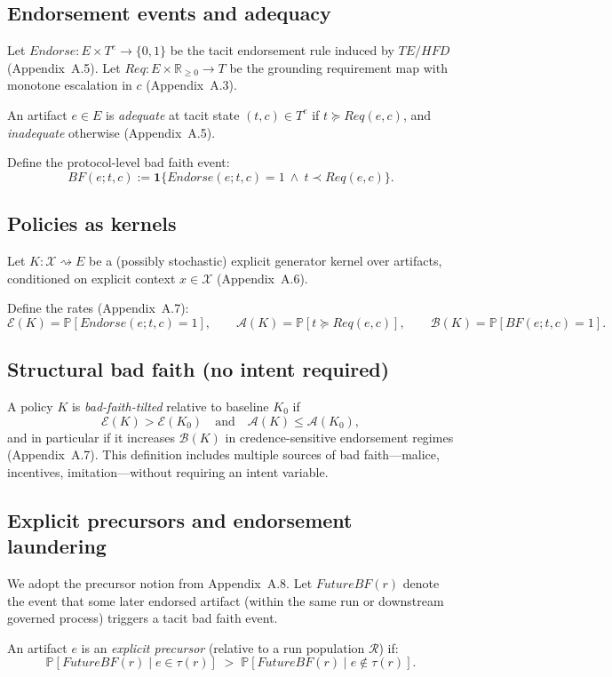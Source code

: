 \documentclass[preprints,article,submit,pdftex,moreauthors,accept]{Definitions/mdpi}
\begin{document}
\subsection{Endorsement events and adequacy}
Let \(Endorse:E\times T^e\to\{0,1\}\) be the tacit endorsement rule induced by \(TE/HFD\) (Appendix~A.5). Let \(Req:E\times\mathbb{R}_{\ge 0}\to T\) be the grounding requirement map with monotone escalation in \(c\) (Appendix~A.3).

An artifact \(e\in E\) is \emph{adequate} at tacit state \((t,c)\in T^e\) if \(t\succeq Req(e,c)\), and \emph{inadequate} otherwise (Appendix~A.5).

Define the protocol-level bad faith event:
\[
BF(e;t,c):=\mathbf{1}\{Endorse(e;t,c)=1 \ \wedge\ t\prec Req(e,c)\}.
\]

\subsection{Policies as kernels}
Let \(K:\mathcal{X}\rightsquigarrow E\) be a (possibly stochastic) explicit generator kernel over artifacts, conditioned on explicit context \(x\in\mathcal{X}\) (Appendix~A.6).

Define the rates (Appendix~A.7):
\[
\mathcal{E}(K)=\mathbb{P}[Endorse(e;t,c)=1],\qquad
\mathcal{A}(K)=\mathbb{P}[t\succeq Req(e,c)],\qquad
\mathcal{B}(K)=\mathbb{P}[BF(e;t,c)=1].
\]

\subsection{Structural bad faith (no intent required)}
A policy \(K\) is \emph{bad-faith-tilted} relative to baseline \(K_0\) if
\[
\mathcal{E}(K)>\mathcal{E}(K_0)\quad\text{and}\quad \mathcal{A}(K)\le \mathcal{A}(K_0),
\]
and in particular if it increases \(\mathcal{B}(K)\) in credence-sensitive endorsement regimes (Appendix~A.7). This definition includes multiple sources of bad faith---malice, incentives, imitation---without requiring an intent variable.

\subsection{Explicit precursors and endorsement laundering}
We adopt the precursor notion from Appendix~A.8. Let \(FutureBF(r)\) denote the event that some later endorsed artifact (within the same run or downstream governed process) triggers a tacit bad faith event.

An artifact \(e\) is an \emph{explicit precursor} (relative to a run population \(\mathcal{R}\)) if:
\[
\mathbb{P}[FutureBF(r)\mid e\in \tau(r)] \;>\; \mathbb{P}[FutureBF(r)\mid e\notin \tau(r)].
\]
\end{document}
